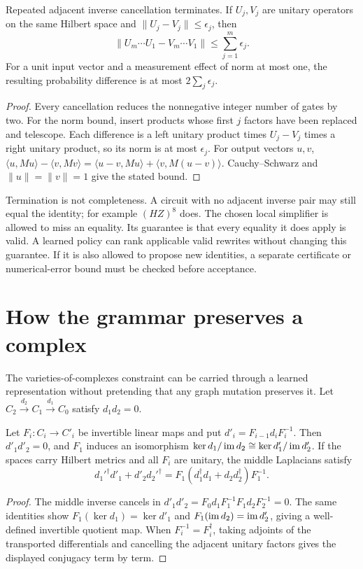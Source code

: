 \begin{proposition}
Repeated adjacent inverse cancellation terminates. If $U_j,V_j$ are unitary operators on the same Hilbert space and $\|U_j-V_j\|\le\epsilon_j$, then
\[
 \|U_m\cdots U_1-V_m\cdots V_1\|\le\sum_{j=1}^m\epsilon_j.
\]
For a unit input vector and a measurement effect of norm at most one, the resulting probability difference is at most $2\sum_j\epsilon_j$.
\end{proposition}
\begin{proof}
Every cancellation reduces the nonnegative integer number of gates by two. For the norm bound, insert products whose first $j$ factors have been replaced and telescope. Each difference is a left unitary product times $U_j-V_j$ times a right unitary product, so its norm is at most $\epsilon_j$. For output vectors $u,v$,
$\langle u,Mu\rangle-\langle v,Mv\rangle
=\langle u-v,Mu\rangle+\langle v,M(u-v)\rangle$.
Cauchy--Schwarz and $\|u\|=\|v\|=1$ give the stated bound.
\end{proof}

Termination is not completeness. A circuit with no adjacent inverse pair may still equal the identity; for example $(HZ)^8$ does. The chosen local simplifier is allowed to miss an equality. Its guarantee is that every equality it does apply is valid. A learned policy can rank applicable valid rewrites without changing this guarantee. If it is also allowed to propose new identities, a separate certificate or numerical-error bound must be checked before acceptance.

\section{How the grammar preserves a complex}

The varieties-of-complexes constraint can be carried through a learned representation without pretending that any graph mutation preserves it. Let
$C_2\xrightarrow{d_2}C_1\xrightarrow{d_1}C_0$ satisfy $d_1d_2=0$.

\begin{proposition}
\label{thm:unitary-chain-transport}
Let $F_i:C_i\to C'_i$ be invertible linear maps and put
$d'_i=F_{i-1}d_iF_i^{-1}$. Then $d'_1d'_2=0$, and $F_1$ induces an isomorphism
$\ker d_1/\operatorname{im} d_2\cong\ker d'_1/\operatorname{im} d'_2$.
If the spaces carry Hilbert metrics and all $F_i$ are unitary, the middle Laplacians satisfy
\[
 d_1'^\dagger d'_1+d'_2d_2'^\dagger
 =F_1(d_1^\dagger d_1+d_2d_2^\dagger)F_1^{-1}.
\]
\end{proposition}
\begin{proof}
The middle inverse cancels in
$d'_1d'_2=F_0d_1F_1^{-1}F_1d_2F_2^{-1}=0$.
The same identities show $F_1(\ker d_1)=\ker d'_1$ and
$F_1(\operatorname{im} d_2)=\operatorname{im} d'_2$, giving a well-defined invertible quotient map. When $F_i^{-1}=F_i^\dagger$, taking adjoints of the transported differentials and cancelling the adjacent unitary factors gives the displayed conjugacy term by term.
\end{proof}


